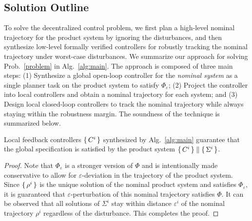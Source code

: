 

 \subsection{Solution Outline}
To solve the decentralized control problem, 
we first plan a high-level nominal trajectory for the product system by ignoring the disturbances, and then synthesize low-level formally verified controllers for robustly tracking the nominal trajectory under worst-case disturbances.
We summarize our approach for solving Prob.~\ref{problem} in Alg.~\ref{alg:main}.
The approach is composed of three main steps:
(1) Synthesize a global open-loop controller for the \emph{nominal system} as a single planner task on the product system to satisfy $\Phi_\varepsilon$;
(2) Project the controller into local controllers and obtain a nominal trajectory for each system; and
(3) Design local closed-loop controllers to track the nominal trajectory while always staying within the robustness margin.
The soundness of the technique is summarized below.

\begin{theorem}
Local feedback controllers $\set{C^i}$ synthesized by Alg.~\ref{alg:main} guarantee that the global specification is satisfied by the product system $\set{C^i}\parallel \set{\Sigma^i}$. 
\end{theorem}
\begin{proof}
Note that $\Phi_\varepsilon$ is a stronger version of $\Phi$ and is intentionally made conservative to allow for $\varepsilon$-deviation in the trajectory of the product system.
Since $\set{\rho^i}$ is the unique solution of the nominal product system and satisfies $\Phi_\varepsilon$, it is guaranteed that $\varepsilon$-perturbation of this nominal trajectory satisfies $\Phi$.
It can be observed that all solutions of $\Sigma^i$ stay within distance $\varepsilon^i$ of the nominal trajectory 
$\rho^i$ regardless of the disturbance. 
This completes the proof.
\end{proof}

